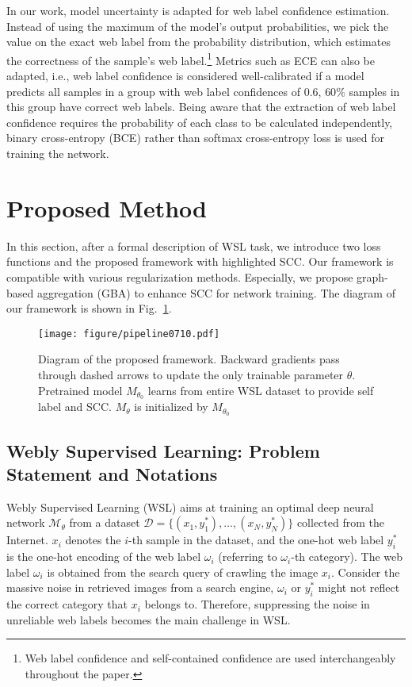 \documentclass[runningheads]{llncs}
\begin{document}
In our work, model uncertainty is adapted for web label confidence estimation. Instead of using the maximum of the model's output probabilities, we pick the value on the exact web label from the probability distribution, which estimates the correctness of the sample's web label.\footnote{Web label confidence and self-contained confidence are used interchangeably throughout the paper.} Metrics such as ECE can also be adapted, i.e., web label confidence is considered well-calibrated if a model predicts all samples in a group with web label confidences of $0.6$, $60\%$ samples in this group have correct web labels. Being aware that the extraction of web label confidence requires the probability of each class to be calculated independently, binary cross-entropy (BCE) rather than softmax cross-entropy loss is used for training the network. 



\section{Proposed Method}
In this section, after a formal description of WSL task, we introduce two loss functions and the proposed framework with highlighted SCC. Our framework is compatible with various regularization methods. Especially, we propose graph-based aggregation (GBA) to enhance SCC for network training. The diagram of our framework is shown in Fig.~\ref{Fig:pipeline}.
	
\begin{figure}[t]
	\centering
	\texttt{[image: figure/pipeline0710.pdf]}
	\smallskip
	\caption{Diagram of the proposed framework. Backward gradients pass through dashed arrows to update the only trainable parameter $\theta$. Pretrained model $M_{\theta_0}$ learns from entire WSL dataset to provide self label and SCC. $M_{\theta}$ is initialized by $M_{\theta_0}$}
	\label{Fig:pipeline}
\end{figure}
	
\subsection{Webly Supervised Learning: Problem Statement and Notations}
\label{S:method-problem}
Webly Supervised Learning (WSL) aims at training an optimal deep neural network $\mathcal{M_\theta}$ from a dataset $\mathcal{D}=\{(x_1, y^*_1),\dots,(x_N, y^*_N)\}$ collected from the Internet.
$x_i$ denotes the $i$-th sample in the dataset, and the one-hot web label $y^*_i$ is the one-hot encoding of the web label $\omega_i$ (referring to $\omega_i$-th category). The web label $\omega_i$ is obtained from the search query of crawling the image $x_i$. Consider the massive noise in retrieved images from a search engine, $\omega_i$ or $y_i^*$ might not reflect the correct category that $x_i$ belongs to. Therefore, suppressing the noise in unreliable web labels becomes the main challenge in WSL.
\end{document}
